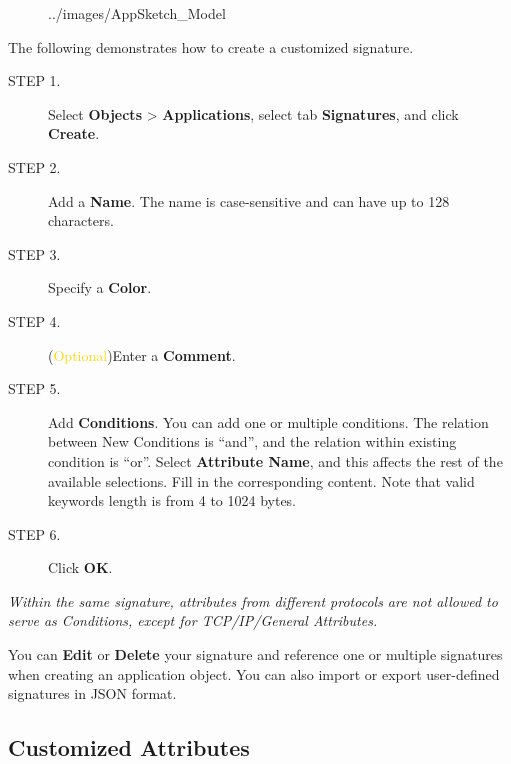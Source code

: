 %    


\begin{figure}[htb]
    \centering
    {../images/AppSketch_Model}
\end{figure}

The following demonstrates how to create a customized signature.

\begin{description}
    \item[STEP 1.]	Select \textbf{Objects} > \textbf{Applications}, select tab \textbf{Signatures}, and click \textbf{Create}.
    \item[STEP 2.]	Add a \textbf{Name}. The name is case-sensitive and can have up to 128 characters.
    \item[STEP 3.]	Specify a \textbf{Color}.
    \item[STEP 4.]	(\textcolor{gold}{Optional})Enter a \textbf{Comment}.
    \item[STEP 5.]	Add \textbf{Conditions}. You can add one or multiple conditions. The relation between New Conditions is “and”, and the relation within existing condition is “or”. 
    Select \textbf{Attribute Name}, and this affects the rest of the available selections. Fill in the corresponding content. Note that valid keywords length is from 4 to 1024 bytes.
    \item[STEP 6.]	Click \textbf{OK}.
\end{description}

\notemark\textit{Within the same signature, attributes from different protocols are not allowed to serve as Conditions, except for TCP/IP/General Attributes.}


You can \textbf{Edit} or \textbf{Delete} your signature and reference one or multiple signatures when creating an application object. 
You can also import or export user-defined signatures in JSON format.


\subsection*{\hypertarget{link:Customized Attributes}{Customized Attributes}}
\label{sec:objects:application:attribute}

